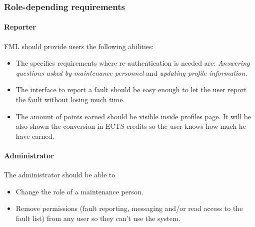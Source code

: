 \subsubsection{Role-depending requirements}

\paragraph{Reporter} FML should provide users the following abilities:
\begin{itemize}
\item The specifics requirements where re-authentication is needed are: \textit{Answering questions asked by maintenance personnel}   \label{Specifics_Secure_Requirements_for_user} and \textit{updating profile information}.
\item The interface to report a fault should be easy enough to let the user report the fault without losing much time.
\item The amount of points earned should be visible inside profiles page. It will be also shown the conversion in ECTS credits so the user knows how much he have earned.

\end{itemize}

\paragraph{Administrator} The administrator should be able to

\begin{itemize}
\item Change the role of a maintenance person.
\item Remove permissions (fault reporting, messaging and/or read access to the fault list) from any user so they can't use the system.
\end{itemize}
